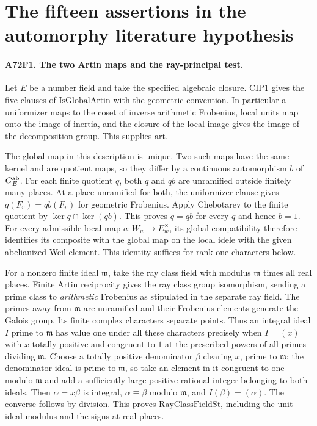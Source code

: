 \section{The fifteen assertions in the automorphy literature hypothesis}

\paragraph{A72F1. The two Artin maps and the ray-principal test.}
Let $E$ be a number field and take the specified algebraic closure.
CIP1 gives the five clauses of $\mathrm{IsGlobalArtin}$ with the
geometric convention. In particular a uniformizer maps to the coset of
inverse arithmetic Frobenius, local units map onto the image of inertia,
and the closure of the local image gives the image of the decomposition
group. This supplies $\mathrm{art}$.

The global map in this description is unique. Two such maps have
the same kernel and are quotient maps, so they differ by a continuous
automorphism $b$ of $G_E^{\rm ab}$. For each finite quotient $q$,
both $q$ and $qb$ are unramified outside finitely many places. At a
place unramified for both, the uniformizer clause gives
$q(F_v)=qb(F_v)$ for geometric Frobenius. Apply Chebotarev to
the finite quotient by $\ker q\cap\ker(qb)$. This proves $q=qb$
for every $q$ and hence $b=1$. For every admissible local map
$a:W_w\to E_w^\times$, its global compatibility therefore identifies
its composite with the global map on the local idele with the given
abelianized Weil element. This identity suffices for rank-one
characters below.

For a nonzero finite ideal $\mathfrak m$, take the ray class field
with modulus $\mathfrak m$ times all real places. Finite Artin
reciprocity gives the ray class group isomorphism, sending
a prime class to \emph{arithmetic} Frobenius as stipulated in
the separate $\mathrm{ray}$ field. The primes away from
$\mathfrak m$ are unramified and their Frobenius elements generate
the Galois group. Its finite complex characters separate points.
Thus an integral ideal $I$ prime to $\mathfrak m$ has value one
under all these characters precisely when $I=(x)$ with $x$ totally
positive and congruent to $1$ at the prescribed powers of all
primes dividing $\mathfrak m$. Choose a totally positive denominator
$\beta$ clearing $x$, prime to $\mathfrak m$: the denominator
ideal is prime to $\mathfrak m$, so take an element in it congruent
to one modulo $\mathfrak m$ and add a sufficiently large positive
rational integer belonging to both ideals. Then $\alpha=x\beta$ is
integral, $\alpha\equiv\beta$ modulo $\mathfrak m$, and
$I(\beta)=(\alpha)$. The converse follows by division. This proves
$\mathrm{RayClassFieldSt}$, including the unit ideal modulus and
the signs at real places.

